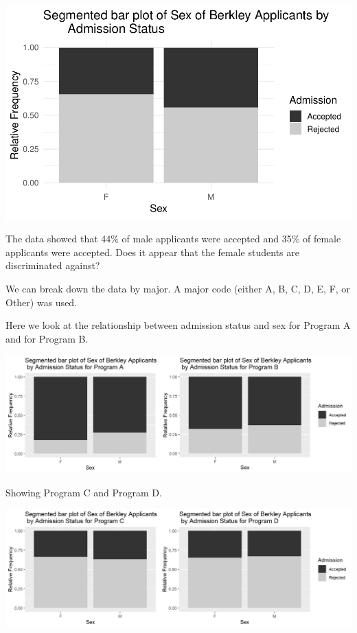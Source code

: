 \documentclass[
]{report}
\begin{document}
\begin{center}\includegraphics[width=0.85\linewidth]{03-LN03-EDA_files/figure-latex/unnamed-chunk-11-1} \end{center}

The data showed that 44\% of male applicants were accepted and 35\% of female applicants were accepted. Does it appear that the female students are discriminated against?

\vspace{0.1in}

We can break down the data by major. A major code (either A, B, C, D, E, F, or Other) was used.

\newpage

Here we look at the relationship between admission status and sex for Program A and for Program B.

\begin{center}\includegraphics[width=0.85\linewidth]{images/SimPara_AB} \end{center}

Showing Program C and Program D.

\begin{center}\includegraphics[width=0.85\linewidth]{images/SimPara_cD} \end{center}
\end{document}
